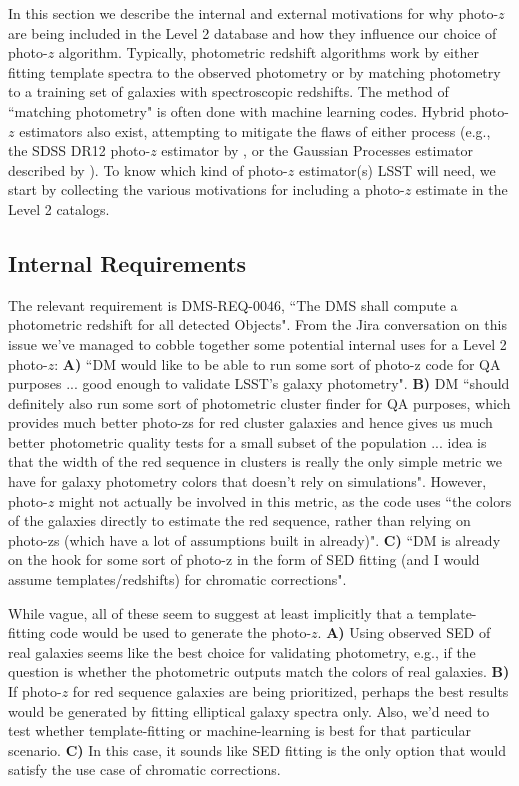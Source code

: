 \documentclass[DM,lsstdraft,toc]{lsstdoc}
\begin{document}
In this section we describe the internal and external motivations for why photo-$z$ are being included in the Level 2 database and how they influence our choice of photo-$z$ algorithm. Typically, photometric redshift algorithms work by either fitting template spectra to the observed photometry or by matching photometry to a training set of galaxies with spectroscopic redshifts. The method of ``matching photometry" is often done with machine learning codes. Hybrid photo-$z$ estimators also exist, attempting to mitigate the flaws of either process (e.g., the SDSS DR12 photo-$z$ estimator by \citealt{2016MNRAS.460.1371B}, or the Gaussian Processes estimator described by \citealt{2016arXiv161200847L}). To know which kind of photo-$z$ estimator(s) LSST will need, we start by collecting the various motivations for including a photo-$z$ estimate in the Level 2 catalogs.

\subsection{Internal Requirements}\label{ssec:motivation_internal}

The relevant requirement is DMS-REQ-0046, ``The DMS shall compute a photometric redshift for all detected Objects". From the Jira conversation on this issue we've managed to cobble together some potential internal uses for a Level 2 photo-$z$:
\noindent \textbf{A)} ``DM would like to be able to run some sort of photo-z code for QA purposes ... good enough to validate LSST's galaxy photometry".
\noindent \textbf{B)} DM ``should definitely also run some sort of photometric cluster finder for QA purposes, which provides much better photo-zs for red cluster galaxies and hence gives us much better photometric quality tests for a small subset of the population ... idea is that the width of the red sequence in clusters is really the only simple metric we have for galaxy photometry colors that doesn't rely on simulations". However, photo-$z$ might not actually be involved in this metric, as the code uses ``the colors of the galaxies directly to estimate the red sequence, rather than relying on photo-zs (which have a lot of assumptions built in already)".
\noindent \textbf{C)} ``DM is already on the hook for some sort of photo-z in the form of SED fitting (and I would assume templates/redshifts) for chromatic corrections".

While vague, all of these seem to suggest at least implicitly that a template-fitting code would be used to generate the photo-$z$.
\noindent \textbf{A)} Using observed SED of real galaxies seems like the best choice for validating photometry, e.g., if the question is whether the photometric outputs match the colors of real galaxies.
\noindent \textbf{B)} If photo-$z$ for red sequence galaxies are being prioritized, perhaps the best results would be generated by fitting elliptical galaxy spectra only. Also, we'd need to test whether template-fitting or machine-learning is best for that particular scenario.
\noindent \textbf{C)} In this case, it sounds like SED fitting is the only option that would satisfy the use case of chromatic corrections.
\end{document}

